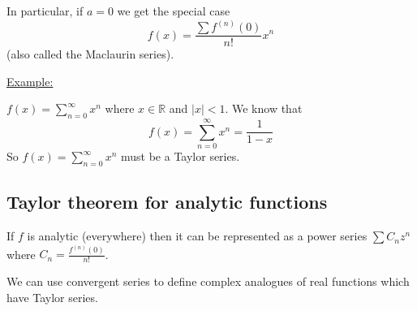 \documentclass{article}
\begin{document}
In particular, if $a = 0$ we get the special case
\[ f (x) = \frac{\sum f^{(n)} (0)}{n!} x^n \]
(also called the Maclaurin series).

{\underline{Example:}}

$f (x) = \sum_{n = 0}^{\infty} x^n$ where $x \in \mathbb{R}$ and $| x | < 1$.
We know that
\[ f (x) = \sum_{n = 0}^{\infty} x^n = \frac{1}{1 - x} \]
So $f (x) = \sum_{n = 0}^{\infty} x^n$ must be a Taylor series.

\subsection*{Taylor theorem for analytic functions}

If $f$ is analytic (everywhere) then it can be represented as a power series
$\sum C_n z^n$ where $C_n = \frac{f^{(n)} (0)}{n!}$.

We can use convergent series to define complex analogues of real functions
which{} have Taylor series.
\end{document}
